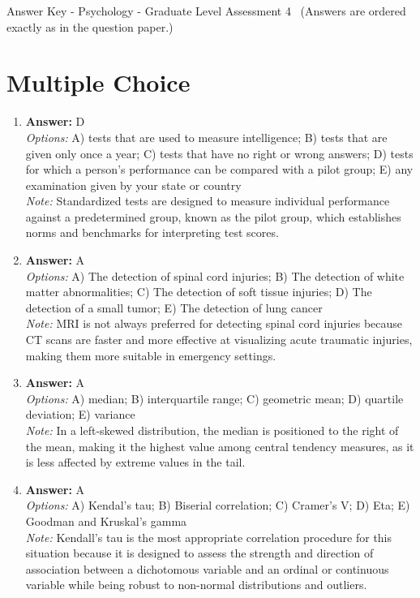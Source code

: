 \documentclass[12pt]{article}
\begin{document}
\begin{center}
Answer Key - Psychology - Graduate Level Assessment 4 \
\small (Answers are ordered exactly as in the question paper.)
\end{center}

\section*{Multiple Choice}
\begin{enumerate}[label=\arabic*.]
\item \textbf{Answer:} D
\\ \textit{Options:} A) tests that are used to measure intelligence; B) tests that are given only once a year; C) tests that have no right or wrong answers; D) tests for which a person's performance can be compared with a pilot group; E) any examination given by your state or country
\\ \textit{Note:} Standardized tests are designed to measure individual performance against a predetermined group, known as the pilot group, which establishes norms and benchmarks for interpreting test scores.
\item \textbf{Answer:} A
\\ \textit{Options:} A) The detection of spinal cord injuries; B) The detection of white matter abnormalities; C) The detection of soft tissue injuries; D) The detection of a small tumor; E) The detection of lung cancer
\\ \textit{Note:} MRI is not always preferred for detecting spinal cord injuries because CT scans are faster and more effective at visualizing acute traumatic injuries, making them more suitable in emergency settings.
\item \textbf{Answer:} A
\\ \textit{Options:} A) median; B) interquartile range; C) geometric mean; D) quartile deviation; E) variance
\\ \textit{Note:} In a left-skewed distribution, the median is positioned to the right of the mean, making it the highest value among central tendency measures, as it is less affected by extreme values in the tail.
\item \textbf{Answer:} A
\\ \textit{Options:} A) Kendal's tau; B) Biserial correlation; C) Cramer's V; D) Eta; E) Goodman and Kruskal's gamma
\\ \textit{Note:} Kendall's tau is the most appropriate correlation procedure for this situation because it is designed to assess the strength and direction of association between a dichotomous variable and an ordinal or continuous variable while being robust to non-normal distributions and outliers.

\end{enumerate}
\end{document}
